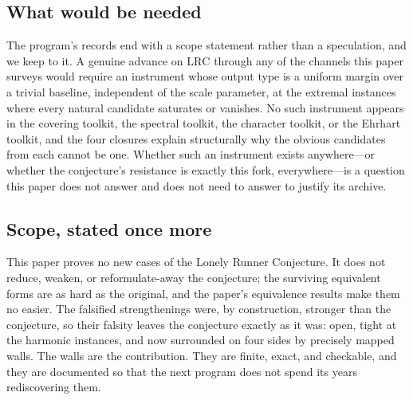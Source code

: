 \documentclass[11pt,a4paper]{article}
\numberwithin{equation}{section}
\theoremstyle{plain}
\theoremstyle{definition}
\theoremstyle{remark}
\newcommand{\lrc}{\mathrm{LRC}}
\begin{document}
\subsection{What would be needed}

The program's records end with a scope statement rather than a
speculation, and we keep to it. A genuine advance on $\lrc$ through any
of the channels this paper surveys would require an instrument whose
output type is a uniform margin over a trivial baseline, independent of
the scale parameter, at the extremal instances where every natural
candidate saturates or vanishes. No such instrument appears in the
covering toolkit, the spectral toolkit, the character toolkit, or the
Ehrhart toolkit, and the four closures explain structurally why the
obvious candidates from each cannot be one. Whether such an instrument
exists anywhere---or whether the conjecture's resistance is exactly this
fork, everywhere---is a question this paper does not answer and does
not need to answer to justify its archive.

\subsection{Scope, stated once more}

This paper proves no new cases of the Lonely Runner Conjecture. It does
not reduce, weaken, or reformulate-away the conjecture; the surviving
equivalent forms are as hard as the original, and the paper's
equivalence results make them no easier. The falsified strengthenings
were, by construction, stronger than the conjecture, so their falsity
leaves the conjecture exactly as it was: open, tight at the harmonic
instances, and now surrounded on four sides by precisely mapped walls.
The walls are the contribution. They are finite, exact, and checkable,
and they are documented so that the next program does not spend its
years rediscovering them.


\end{document}
